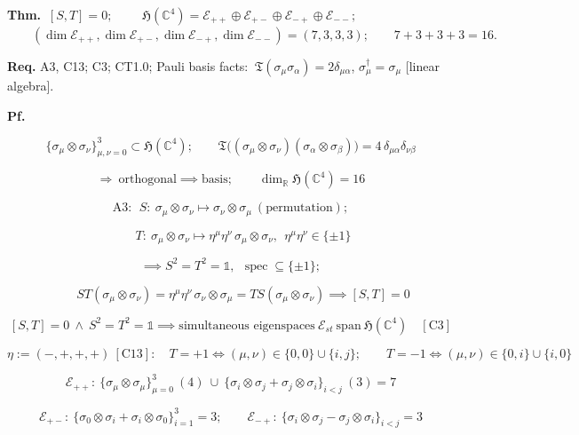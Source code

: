 \begin{theorem}\label{tag:CT1-1}
\textbf{Thm.} $\ [S,T]=0;$ $\qquad\mathfrak H(\mathbb C^4)=\mathcal E_{++}\oplus\mathcal E_{+-}\oplus\mathcal E_{-+}\oplus\mathcal E_{--};$ $\qquad(\dim\mathcal E_{++},\dim\mathcal E_{+-},\dim\mathcal E_{-+},\dim\mathcal E_{--})=(7,3,3,3);\qquad7+3+3+3=16.$

\textbf{Req.} A3, C13; C3; CT1.0; Pauli basis facts: $\ \mathfrak T(\sigma_\mu\sigma_\alpha)=2\delta_{\mu\alpha}$, $\sigma_\mu^\dagger=\sigma_\mu$ [linear algebra].

\textbf{Pf.}

\[
\bigl\{\sigma_\mu\otimes\sigma_\nu\bigr\}_{\mu,\nu=0}^{3}\subset\mathfrak H(\mathbb C^4);\qquad
\mathfrak T\bigl((\sigma_\mu\otimes\sigma_\nu)(\sigma_\alpha\otimes\sigma_\beta)\bigr)=4\,\delta_{\mu\alpha}\delta_{\nu\beta}
\]

\[
\Longrightarrow\ \text{orthogonal}\implies\text{basis};\qquad\dim_{\mathbb R}\mathfrak H(\mathbb C^4)=16
\]

\[
\mathrm{A3}:\ \ S:\ \sigma_\mu\otimes\sigma_\nu\mapsto\sigma_\nu\otimes\sigma_\mu\ (\text{permutation});
\]

\[
\qquad T:\ \sigma_\mu\otimes\sigma_\nu\mapsto\eta^\mu\eta^\nu\,\sigma_\mu\otimes\sigma_\nu,\ \ \eta^\mu\eta^\nu\in\{\pm1\}
\]

\[
\implies S^2=T^2=\mathbb1,\ \ \operatorname{spec}\subseteq\{\pm1\};
\]

\[
\qquad ST(\sigma_\mu\otimes\sigma_\nu)=\eta^\mu\eta^\nu\,\sigma_\nu\otimes\sigma_\mu=TS(\sigma_\mu\otimes\sigma_\nu)\implies[S,T]=0
\]

\[
[S,T]=0\ \wedge\ S^2=T^2=\mathbb1\implies\text{simultaneous eigenspaces}\ \mathcal E_{st}\ \text{span}\ \mathfrak H(\mathbb C^4)\quad[\mathrm{C3}]
\]

\[
\eta:=(-,+,+,+)\ [\mathrm{C13}]:\quad T=+1\iff(\mu,\nu)\in\{0,0\}\cup\{i,j\};\qquad T=-1\iff(\mu,\nu)\in\{0,i\}\cup\{i,0\}
\]

\[
\mathcal E_{++}:\ \{\sigma_\mu\otimes\sigma_\mu\}_{\mu=0}^{3}\ (4)\ \cup\ \{\sigma_i\otimes\sigma_j+\sigma_j\otimes\sigma_i\}_{i<j}\ (3)=7
\]

\[
\mathcal E_{+-}:\ \{\sigma_0\otimes\sigma_i+\sigma_i\otimes\sigma_0\}_{i=1}^{3}=3;\qquad
\mathcal E_{-+}:\ \{\sigma_i\otimes\sigma_j-\sigma_j\otimes\sigma_i\}_{i<j}=3
\]


\end{theorem}
